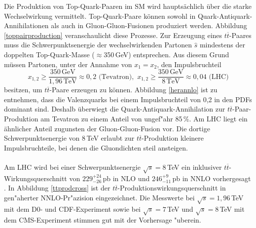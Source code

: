 Die Produktion von Top-Quark-Paaren im SM wird haupts\"achlich \"uber die starke Wechselwirkung vermittelt. Top-Quark-Paare k\"onnen sowohl in Quark-Antiquark-Annihilationen als auch in Gluon-Gluon-Fusionen produziert werden. Abbildung \ref{toppairproduction} veranschaulicht diese Prozesse. Zur Erzeugung eines $t\overline{t}$-Paares muss die Schwerpunkts\-energie der wechselwirkenden Partonen $\hat{s}$ mindestens der doppelten Top-Quark-Masse ($\approx$350\,GeV) entsprechen. Aus diesem Grund m\"ussen Partonen, unter der Annahme von $x_{1}=x_{2}$, den Impulsbruchteil
\begin{equation}
x_{1,2}\geq \frac{350\,\text{GeV}}{1,96\,\text{TeV}}\approx 0,2 \text{ (Tevatron)},\,\,x_{1,2}\geq \frac{350\,\text{GeV}}{8\,\text{TeV}}\approx 0,04 \text{ (LHC)}
\end{equation}
besitzen, um $t\overline{t}$-Paare erzeugen zu k\"onnen. Abbildung \ref{herannlo} ist zu entnehmen, dass die Valenz\-quarks bei einem Impulsbruchteil von 0,2 in den PDFs dominant sind. Deshalb \"uberwiegt die Quark-Antiquark-Annihilation zur $t\overline{t}$-Paar-Produktion am Tevatron zu ei\-nem Anteil von ungef"ahr 85\,\%. Am LHC liegt ein \"ahnlicher Anteil zugunsten der Gluon-Gluon-Fusion vor. Die dortige Schwerpunkts\-energie von 8\,TeV erlaubt zur $t\overline{t}$-Produktion kleinere Impulsbruchteile, bei denen die Gluondichten steil ansteigen.
\\
\\
Am LHC wird bei einer Schwerpunkts\-energie $\sqrt{s}=8$\,TeV ein inklusiver $t\overline{t}$-Wirkungs\-querschnitt von $229_{-26}^{+24}$\,pb in NLO \cite{Cacciari:2011hy} und $246_{-11}^{+9}$\,pb in NNLO vorhergesagt \cite{Czakon:2013goa}. In Abbildung \ref{ttprodcross} ist der $t\overline{t}$-Produktionswirkungsquerschnitt in gen"aherter NNLO-Pr"azision eingezeichnet. Die Messwerte bei $\sqrt{s}=1,96$\,TeV mit dem D0- und CDF-Experiment sowie bei $\sqrt{s}=7$\,TeV und $\sqrt{s}=8$\,TeV mit dem CMS-Experiment stimmen gut mit der Vorhersage "uberein.\\
\\
